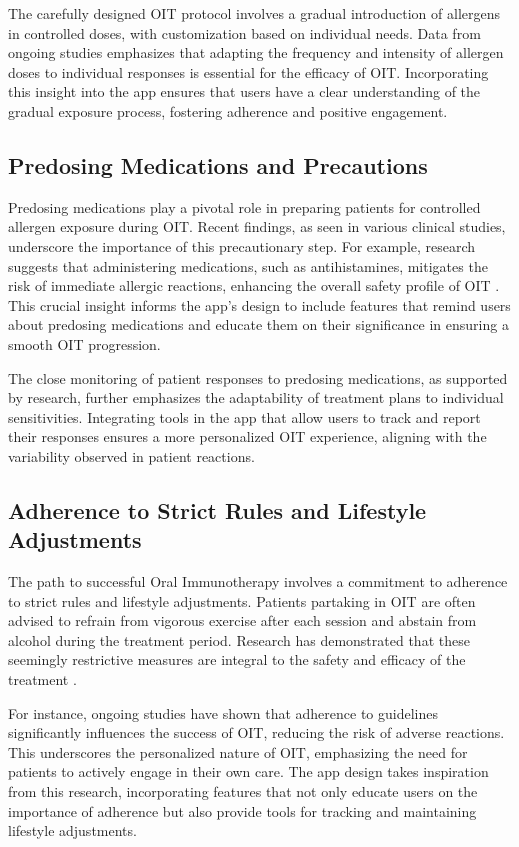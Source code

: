 The carefully designed OIT protocol involves a gradual introduction of allergens in controlled doses, with customization based on individual needs. Data from ongoing studies emphasizes that adapting the frequency and intensity of allergen doses to individual responses is essential for the efficacy of OIT. Incorporating this insight into the app ensures that users have a clear understanding of the gradual exposure process, fostering adherence and positive engagement.

\subsection{Predosing Medications and Precautions}

Predosing medications play a pivotal role in preparing patients for controlled allergen exposure during OIT. Recent findings, as seen in various clinical studies, underscore the importance of this precautionary step. For example, research suggests that administering medications, such as antihistamines, mitigates the risk of immediate allergic reactions, enhancing the overall safety profile of OIT \cite{Gilbert}. This crucial insight informs the app's design to include features that remind users about predosing medications and educate them on their significance in ensuring a smooth OIT progression.

The close monitoring of patient responses to predosing medications, as supported by research, further emphasizes the adaptability of treatment plans to individual sensitivities. Integrating tools in the app that allow users to track and report their responses ensures a more personalized OIT experience, aligning with the variability observed in patient reactions.

\subsection{Adherence to Strict Rules and Lifestyle Adjustments}

The path to successful Oral Immunotherapy involves a commitment to adherence to strict rules and lifestyle adjustments. Patients partaking in OIT are often advised to refrain from vigorous exercise after each session and abstain from alcohol during the treatment period. Research has demonstrated that these seemingly restrictive measures are integral to the safety and efficacy of the treatment \cite{Dominguez}.

For instance, ongoing studies have shown that adherence to guidelines significantly influences the success of OIT, reducing the risk of adverse reactions. This underscores the personalized nature of OIT, emphasizing the need for patients to actively engage in their own care. The app design takes inspiration from this research, incorporating features that not only educate users on the importance of adherence but also provide tools for tracking and maintaining lifestyle adjustments.

